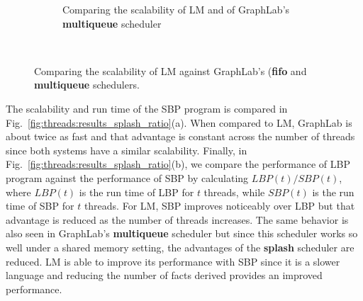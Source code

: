 \begin{figure}[]
\begin{subfigure}[b]{\plotsize\textwidth}
           \caption{Comparing the scalability of LM and of GraphLab's
              \textbf{multiqueue} scheduler}
           \label{fig:threads:splash_multi}
        \end{subfigure} \\
        \caption{Comparing the scalability of LM against GraphLab's (\textbf{fifo}
        and \textbf{multiqueue} schedulers.}
        \label{fig:threads:results_splash}
\end{figure}

The scalability and run time of the SBP program is compared in
Fig.~\ref{fig:threads:results_splash_ratio}(a). When compared to LM, GraphLab is
about twice as fast and that advantage is constant across the number of threads
since both systems have a similar scalability. Finally, in
Fig.~\ref{fig:threads:results_splash_ratio}(b), we compare the performance of
LBP program against the performance of SBP by calculating $LBP(t)/SBP(t)$, where
$LBP(t)$ is the run time of LBP for $t$ threads, while $SBP(t)$ is the run time
of SBP for $t$ threads. For LM, SBP improves noticeably over LBP but that
advantage is reduced as the number of threads increases. The same behavior is
also seen in GraphLab's \textbf{multiqueue} scheduler but since this scheduler
works so well under a shared memory setting, the advantages of the
\textbf{splash} scheduler are reduced. LM is able to improve its performance
with SBP since it is a slower language and reducing the number of facts derived
provides an improved performance.

